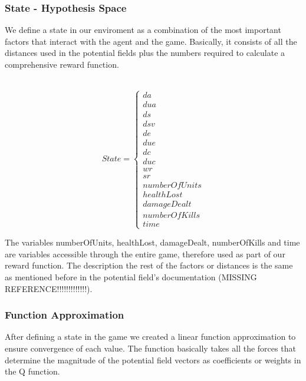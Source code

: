\subsubsection{State - Hypothesis Space}

We define a state in our enviroment as a combination of the most important factors that interact with the agent and the game. Basically, it consists of all the distances used in the potential fields plus the numbers required to calculate a comprehensive reward function. 

\\
\begin{displaymath}
                       State = \begin{cases}
                         da \\  dua \\  ds \\  dsv \\ de \\ due \\ dc \\ duc \\ wr \\ sr \\ numberOfUnits \\ healthLost \\ damageDealt \\ numberOfKills \\ time
                      \end{cases}
\end{displaymath}

The variables numberOfUnits, healthLost, damageDealt, numberOfKills and time are variables accessible through the entire game, therefore used as part of our reward function. The description the rest of the factors or distances is the same as mentioned before in the potential field's documentation (MISSING REFERENCE!!!!!!!!!!!!!). 

\subsubsection{Function Approximation}

After defining a state in the game we created a linear function approximation to ensure convergence of each value. The function basically takes all the forces that determine the magnitude of the potential field vectors as coefficients or weights in the Q function. \\ 

